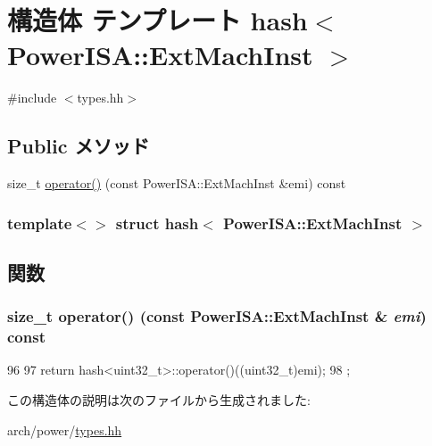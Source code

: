 \hypertarget{structhash_3_01PowerISA_1_1ExtMachInst_01_4}{
\section{構造体 テンプレート hash$<$ PowerISA::ExtMachInst $>$}
\label{structhash_3_01PowerISA_1_1ExtMachInst_01_4}
}


{\ttfamily \#include $<$types.hh$>$}\subsection*{Public メソッド}
\begin{DoxyCompactItemize}
\item 
size\_\-t \hyperlink{structhash_3_01PowerISA_1_1ExtMachInst_01_4_a5fb4fe7f003a3470eb074e6d66a9d878}{operator()} (const PowerISA::ExtMachInst \&emi) const 
\end{DoxyCompactItemize}
\subsubsection*{template$<$$>$ struct hash$<$ PowerISA::ExtMachInst $>$}



\subsection{関数}
\hypertarget{structhash_3_01PowerISA_1_1ExtMachInst_01_4_a5fb4fe7f003a3470eb074e6d66a9d878}{
\subsubsection[{operator()}]{\setlength{\rightskip}{0pt plus 5cm}size\_\-t operator() (const PowerISA::ExtMachInst \& {\em emi}) const}}
\label{structhash_3_01PowerISA_1_1ExtMachInst_01_4_a5fb4fe7f003a3470eb074e6d66a9d878}



\begin{DoxyCode}
96                                                             {
97         return hash<uint32_t>::operator()((uint32_t)emi);
98     };
\end{DoxyCode}


この構造体の説明は次のファイルから生成されました:\begin{DoxyCompactItemize}
\item 
arch/power/\hyperlink{arch_2power_2types_8hh}{types.hh}\end{DoxyCompactItemize}
